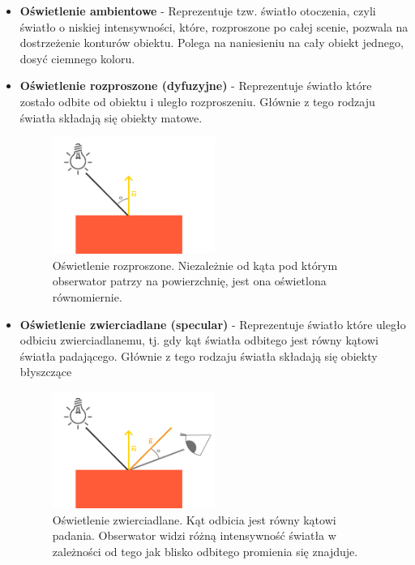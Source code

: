 \documentclass[a4paper]{article}
\begin{document}
\begin{itemize}
    \item \textbf{Oświetlenie ambientowe} - Reprezentuje tzw. światło otoczenia,
          czyli światło o niskiej intensywności, które, rozproszone po całej
          scenie, pozwala na dostrzeżenie konturów obiektu. Polega na
          naniesieniu na cały obiekt jednego, dosyć ciemnego koloru.

    \item \textbf{Oświetlenie rozproszone (dyfuzyjne)} - Reprezentuje światło
          które zostało odbite od obiektu i uległo rozproszeniu. Głównie z tego
          rodzaju światła składają się obiekty matowe.

          \begin{figure}[H]
              \centering
              \includegraphics[width=0.5\textwidth]{diffuse_light}
              \caption{Oświetlenie rozproszone. Niezależnie od kąta pod którym obserwator patrzy na powierzchnię, jest ona oświetlona równomiernie.}
          \end{figure}

    \item \textbf{Oświetlenie zwierciadlane (specular)} - Reprezentuje światło
          które uległo odbiciu zwierciadlanemu, tj. gdy kąt światła odbitego
          jest równy kątowi światła padającego. Głównie z tego rodzaju światła
          składają się obiekty błyszczące

          \begin{figure}[H]
              \centering
              \includegraphics[width=0.5\textwidth]{specular_light}
              \caption{Oświetlenie zwierciadlane. Kąt odbicia jest równy kątowi padania. Obserwator widzi różną intensywność światła w zależności od tego jak blisko odbitego promienia się znajduje.}
          \end{figure}
\end{itemize}
\end{document}
